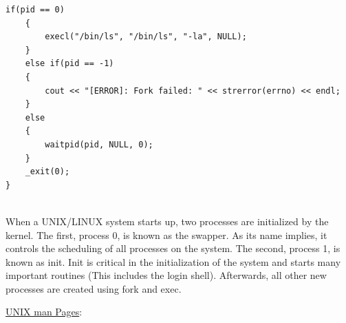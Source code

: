 \documentclass[12pt]{extarticle}
\newenvironment{myindentpar}[1]%
 {\begin{list}{}%
         {\setlength{\leftmargin}{#1}}%
         \item[]%
 }
 {\end{list}}
\begin{document}
\begin{myindentpar}{5mm}
\begin{lstlisting}[frame=single]
    if(pid == 0)
    {
        execl("/bin/ls", "/bin/ls", "-la", NULL);
    }
    else if(pid == -1)
    {
        cout << "[ERROR]: Fork failed: " << strerror(errno) << endl;
    }
    else
    {
        waitpid(pid, NULL, 0);
    }
    _exit(0);
}
\end{lstlisting}

\newpage

    \ \\
    When a UNIX/LINUX system starts up, two processes are initialized by the kernel.  The first, process 0, is known as the swapper.  As its name implies, it controls the scheduling of all processes on the system.  The second, process 1, is known as init.  Init is critical in the initialization of the system and starts many important routines (This includes the login shell).  Afterwards, all other new processes are created using fork and exec.  

\end{myindentpar}

\newpage
\noindent
{\large \underline{UNIX man Pages}:}
\end{document}
